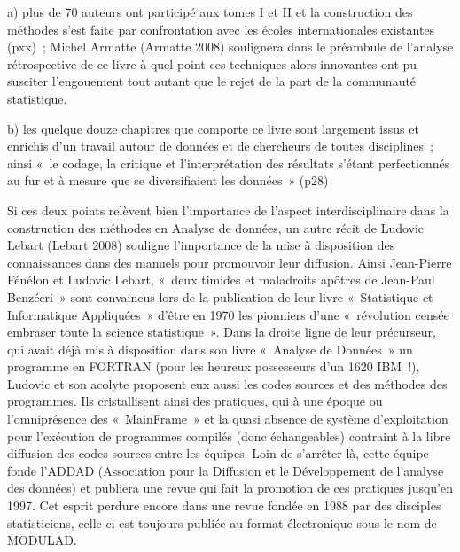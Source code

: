a)  plus de 70 auteurs ont participé aux tomes I et II et la construction des méthodes s'est faite par confrontation avec les écoles internationales existantes (pxx) ; Michel Armatte (Armatte 2008) soulignera dans le préambule de l'analyse rétrospective de ce livre à quel point ces techniques alors innovantes ont pu susciter l'engouement tout autant que le rejet de la part de la communauté statistique.

 b)  les quelque douze chapitres que comporte ce livre sont largement issus et enrichis d'un travail autour de données et de chercheurs de toutes disciplines ; ainsi « le codage, la critique et l'interprétation des résultats s'étant perfectionnés au fur et à mesure que se diversifiaient les données » (p28) 

Si ces deux points relèvent bien l'importance de l'aspect interdisciplinaire dans la construction des méthodes en Analyse de données, un autre récit de Ludovic Lebart (Lebart 2008) souligne l'importance de la mise à disposition des connaissances dans des manuels pour promouvoir leur diffusion. Ainsi Jean-Pierre Fénélon et Ludovic Lebart, « deux timides et  maladroits apôtres de Jean-Paul Benzécri » sont convaincus lors de la publication de leur livre « Statistique et Informatique Appliquées » d'être en 1970  les pionniers d'une « révolution censée embraser toute la science statistique ». Dans la droite ligne de leur précurseur, qui avait déjà mis à disposition dans son livre « Analyse de Données » un programme en FORTRAN (pour les heureux possesseurs d'un 1620 IBM !), Ludovic et son acolyte proposent eux aussi les codes sources et des méthodes des programmes. Ils cristallisent ainsi des pratiques, qui à une époque ou l'omniprésence des « MainFrame » et la quasi absence de système d'exploitation pour l’exécution de programmes compilés (donc échangeables) contraint à la libre diffusion des codes sources entre les équipes. Loin de s’arrêter là, cette équipe fonde l'ADDAD (Association pour la Diffusion et le Développement de l'analyse des données) et publiera une revue qui fait la promotion de ces pratiques jusqu'en 1997. Cet esprit perdure encore dans une revue fondée en 1988 par des disciples statisticiens, celle ci est toujours publiée au format électronique sous le nom de  MODULAD. 

